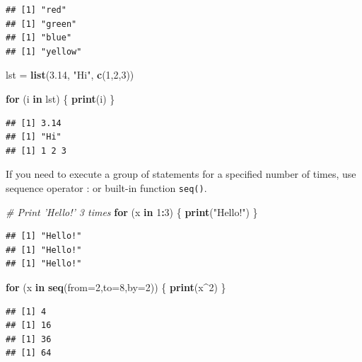 \documentclass[
]{book}
\newenvironment{Shaded}{\begin{snugshade}}{\end{snugshade}}
\newcommand{\CommentTok}[1]{\textcolor[rgb]{0.56,0.35,0.01}{\textit{#1}}}
\newcommand{\ControlFlowTok}[1]{\textcolor[rgb]{0.13,0.29,0.53}{\textbf{#1}}}
\newcommand{\DataTypeTok}[1]{\textcolor[rgb]{0.13,0.29,0.53}{#1}}
\newcommand{\DecValTok}[1]{\textcolor[rgb]{0.00,0.00,0.81}{#1}}
\newcommand{\FloatTok}[1]{\textcolor[rgb]{0.00,0.00,0.81}{#1}}
\newcommand{\KeywordTok}[1]{\textcolor[rgb]{0.13,0.29,0.53}{\textbf{#1}}}
\newcommand{\NormalTok}[1]{#1}
\newcommand{\OperatorTok}[1]{\textcolor[rgb]{0.81,0.36,0.00}{\textbf{#1}}}
\newcommand{\StringTok}[1]{\textcolor[rgb]{0.31,0.60,0.02}{#1}}
\begin{document}
\begin{verbatim}
## [1] "red"
## [1] "green"
## [1] "blue"
## [1] "yellow"
\end{verbatim}

\begin{Shaded}
\begin{Highlighting}[]
\NormalTok{lst =}\StringTok{ }\KeywordTok{list}\NormalTok{(}\FloatTok{3.14}\NormalTok{, }\StringTok{"Hi"}\NormalTok{, }\KeywordTok{c}\NormalTok{(}\DecValTok{1}\NormalTok{,}\DecValTok{2}\NormalTok{,}\DecValTok{3}\NormalTok{))}

\ControlFlowTok{for}\NormalTok{ (i }\ControlFlowTok{in}\NormalTok{ lst) \{}
  \KeywordTok{print}\NormalTok{(i)}
\NormalTok{\}}
\end{Highlighting}
\end{Shaded}

\begin{verbatim}
## [1] 3.14
## [1] "Hi"
## [1] 1 2 3
\end{verbatim}

If you need to execute a group of statements for a specified number of times, use sequence operator : or built-in function \texttt{seq()}.

\begin{Shaded}
\begin{Highlighting}[]
\CommentTok{# Print 'Hello!' 3 times}
\ControlFlowTok{for}\NormalTok{ (x }\ControlFlowTok{in} \DecValTok{1}\OperatorTok{:}\DecValTok{3}\NormalTok{) \{}
  \KeywordTok{print}\NormalTok{(}\StringTok{"Hello!"}\NormalTok{)}
\NormalTok{\}}
\end{Highlighting}
\end{Shaded}

\begin{verbatim}
## [1] "Hello!"
## [1] "Hello!"
## [1] "Hello!"
\end{verbatim}

\begin{Shaded}
\begin{Highlighting}[]
\ControlFlowTok{for}\NormalTok{ (x }\ControlFlowTok{in} \KeywordTok{seq}\NormalTok{(}\DataTypeTok{from=}\DecValTok{2}\NormalTok{,}\DataTypeTok{to=}\DecValTok{8}\NormalTok{,}\DataTypeTok{by=}\DecValTok{2}\NormalTok{)) \{}
  \KeywordTok{print}\NormalTok{(x}\OperatorTok{^}\DecValTok{2}\NormalTok{)}
\NormalTok{\}}
\end{Highlighting}
\end{Shaded}

\begin{verbatim}
## [1] 4
## [1] 16
## [1] 36
## [1] 64
\end{verbatim}
\end{document}

